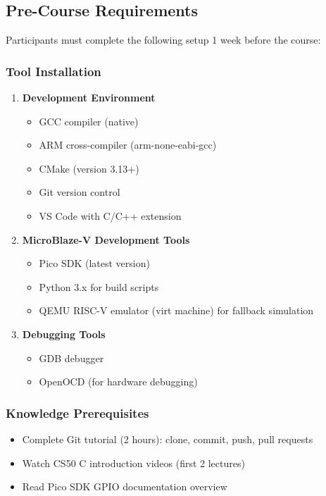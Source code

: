 \documentclass[11pt,a4paper]{article}
\begin{document}
\subsection{Pre-Course Requirements}
Participants must complete the following setup 1 week before the course:

\subsubsection{Tool Installation}
\begin{enumerate}
    \item \textbf{Development Environment}
    \begin{itemize}
        \item GCC compiler (native)
        \item ARM cross-compiler (arm-none-eabi-gcc)
        \item CMake (version 3.13+)
        \item Git version control
        \item VS Code with C/C++ extension
    \end{itemize}

    \item \textbf{MicroBlaze-V Development Tools}
    \begin{itemize}
        \item Pico SDK (latest version)
        \item Python 3.x for build scripts
        \item QEMU RISC-V emulator (virt machine) for fallback simulation
    \end{itemize}

    \item \textbf{Debugging Tools}
    \begin{itemize}
        \item GDB debugger
        \item OpenOCD (for hardware debugging)
    \end{itemize}
\end{enumerate}

\subsubsection{Knowledge Prerequisites}
\begin{itemize}
    \item Complete Git tutorial (2 hours): clone, commit, push, pull requests
    \item Watch CS50 C introduction videos (first 2 lectures)
    \item Read Pico SDK GPIO documentation overview
\end{itemize}
\end{document}
